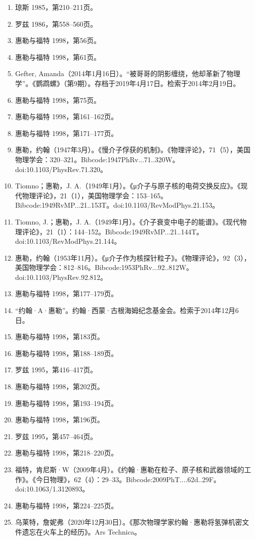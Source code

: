 \begin{enumerate}
\item 琼斯 1985，第210–211页。
\item 罗兹 1986，第558–560页。
\item 惠勒与福特 1998，第56页。
\item 惠勒与福特 1998，第61页。
\item Gefter, Amanda（2014年1月16日）。“被哥哥的阴影缠绕，他却革新了物理学”。《鹦鹉螺》（第9期）。存档于2019年4月17日。检索于2014年2月19日。
\item 惠勒与福特 1998，第75页。
\item 惠勒与福特 1998，第161–162页。
\item 惠勒与福特 1998，第171–177页。
\item 惠勒，约翰（1947年3月）。《慢介子俘获的机制》。《物理评论》，71（5），美国物理学会：320–321。Bibcode:1947PhRv...71..320W。doi:10.1103/PhysRev.71.320。
\item Tiomno；惠勒，J. A.（1949年1月）。《μ介子与原子核的电荷交换反应》。《现代物理评论》，21（1），美国物理学会：153–165。Bibcode:1949RvMP...21..153T。doi:10.1103/RevModPhys.21.153。
\item Tiomno, J.；惠勒，J. A.（1949年1月）。《介子衰变中电子的能谱》。《现代物理评论》，21（1）：144–152。Bibcode:1949RvMP...21..144T。doi:10.1103/RevModPhys.21.144。
\item 惠勒，约翰（1953年11月）。《μ介子作为核探针粒子》。《物理评论》，92（3），美国物理学会：812–816。Bibcode:1953PhRv...92..812W。doi:10.1103/PhysRev.92.812。
\item 惠勒与福特 1998，第177–179页。
\item “约翰·A·惠勒”。约翰·西蒙·古根海姆纪念基金会。检索于2014年12月6日。
\item 惠勒与福特 1998，第183页。
\item 惠勒与福特 1998，第188–189页。
\item 罗兹 1995，第416–417页。
\item 惠勒与福特 1998，第202页。
\item 惠勒与福特 1998，第193–194页。
\item 惠勒与福特 1998，第196页。
\item 罗兹 1995，第457–464页。
\item 惠勒与福特 1998，第218–220页。
\item 福特，肯尼斯·W（2009年4月）。《约翰·惠勒在粒子、原子核和武器领域的工作》。《今日物理》，62（4）：29–33。Bibcode:2009PhT....62d..29F。doi:10.1063/1.3120893。
\item 惠勒与福特 1998，第224–225页。
\item 乌莱特，詹妮弗（2020年12月30日）。《那次物理学家约翰·惠勒将氢弹机密文件遗忘在火车上的经历》。Ars Technica。

\end{enumerate}
